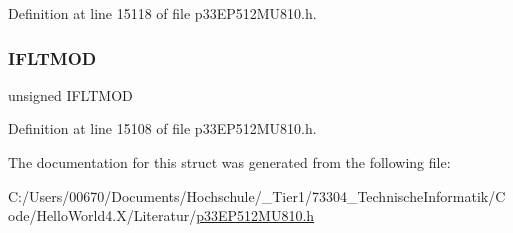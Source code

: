 Definition at line 15118 of file p33\+E\+P512\+M\+U810.\+h.

\mbox{\label{structtag_f_c_l_c_o_n5_b_i_t_s_a4573eed251d96a98a6b5ba1c7cc30451}} 
\subsubsection{\texorpdfstring{I\+F\+L\+T\+M\+OD}{IFLTMOD}}
{\footnotesize\ttfamily unsigned I\+F\+L\+T\+M\+OD}



Definition at line 15108 of file p33\+E\+P512\+M\+U810.\+h.



The documentation for this struct was generated from the following file\+:\begin{DoxyCompactItemize}
\item 
C\+:/\+Users/00670/\+Documents/\+Hochschule/\+\_\+\+Tier1/73304\+\_\+\+Technische\+Informatik/\+Code/\+Hello\+World4.\+X/\+Literatur/\hyperlink{p33_e_p512_m_u810_8h}{p33\+E\+P512\+M\+U810.\+h}\end{DoxyCompactItemize}
